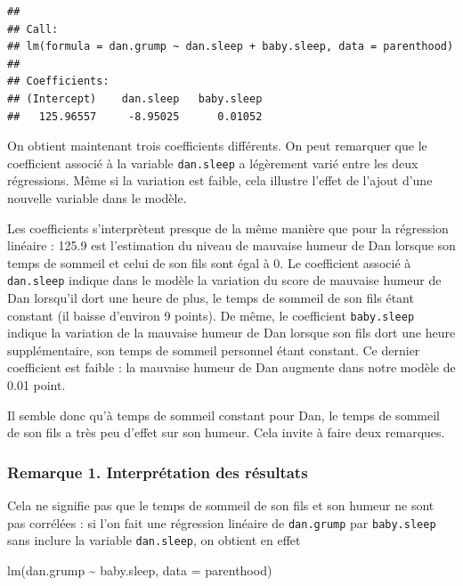 \documentclass[
  french,
]{book}
\newenvironment{Shaded}{\begin{snugshade}}{\end{snugshade}}
\newcommand{\AttributeTok}[1]{\textcolor[rgb]{0.77,0.63,0.00}{#1}}
\newcommand{\FunctionTok}[1]{\textcolor[rgb]{0.00,0.00,0.00}{#1}}
\newcommand{\NormalTok}[1]{#1}
\newcommand{\SpecialCharTok}[1]{\textcolor[rgb]{0.00,0.00,0.00}{#1}}
\begin{document}
\begin{verbatim}
## 
## Call:
## lm(formula = dan.grump ~ dan.sleep + baby.sleep, data = parenthood)
## 
## Coefficients:
## (Intercept)    dan.sleep   baby.sleep  
##   125.96557     -8.95025      0.01052
\end{verbatim}

On obtient maintenant trois coefficients différents. On peut remarquer que le coefficient associé à la variable \texttt{dan.sleep} a légèrement varié entre les deux régressions. Même si la variation est faible, cela illustre l'effet de l'ajout d'une nouvelle variable dans le modèle.

Les coefficients s'interprètent presque de la même manière que pour la régression linéaire : 125.9 est l'estimation du niveau de mauvaise humeur de Dan lorsque son temps de sommeil et celui de son fils sont égal à 0. Le coefficient associé à \texttt{dan.sleep} indique dans le modèle la variation du score de mauvaise humeur de Dan lorsqu'il dort une heure de plus, le temps de sommeil de son fils étant constant (il baisse d'environ 9 points). De même, le coefficient \texttt{baby.sleep} indique la variation de la mauvaise humeur de Dan lorsque son fils dort une heure supplémentaire, son temps de sommeil personnel étant constant. Ce dernier coefficient est faible : la mauvaise humeur de Dan augmente dans notre modèle de 0.01 point.

Il semble donc qu'à temps de sommeil constant pour Dan, le temps de sommeil de son fils a très peu d'effet sur son humeur. Cela invite à faire deux remarques.

\hypertarget{remarque-1.-interpruxe9tation-des-ruxe9sultats}{%
\subsubsection{Remarque 1. Interprétation des résultats}\label{remarque-1.-interpruxe9tation-des-ruxe9sultats}}

Cela ne signifie pas que le temps de sommeil de son fils et son humeur ne sont pas corrélées : si l'on fait une régression linéaire de \texttt{dan.grump} par \texttt{baby.sleep} sans inclure la variable \texttt{dan.sleep}, on obtient en effet

\begin{Shaded}
\begin{Highlighting}[]
\FunctionTok{lm}\NormalTok{(dan.grump }\SpecialCharTok{\textasciitilde{}}\NormalTok{ baby.sleep, }\AttributeTok{data =}\NormalTok{ parenthood)}
\end{Highlighting}
\end{Shaded}
\end{document}

